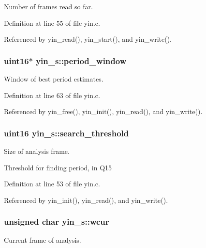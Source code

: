 Number of frames read so far. 



Definition at line 55 of file yin.\-c.



Referenced by yin\-\_\-read(), yin\-\_\-start(), and yin\-\_\-write().

\subsubsection[{period\-\_\-window}]{\setlength{\rightskip}{0pt plus 5cm}uint16$\ast$ yin\-\_\-s\-::period\-\_\-window}\label{structyin__s_a1928cec127e250f6cd15249085bc9fc8}


Window of best period estimates. 



Definition at line 63 of file yin.\-c.



Referenced by yin\-\_\-free(), yin\-\_\-init(), yin\-\_\-read(), and yin\-\_\-write().

\subsubsection[{search\-\_\-threshold}]{\setlength{\rightskip}{0pt plus 5cm}uint16 yin\-\_\-s\-::search\-\_\-threshold}\label{structyin__s_a8cca938167af6b504458ff9578420afd}


Size of analysis frame. 

Threshold for finding period, in Q15 

Definition at line 53 of file yin.\-c.



Referenced by yin\-\_\-init(), yin\-\_\-read(), and yin\-\_\-write().

\subsubsection[{wcur}]{\setlength{\rightskip}{0pt plus 5cm}unsigned char yin\-\_\-s\-::wcur}\label{structyin__s_ab79376deb3761d5d3ae72f727ac25660}


Current frame of analysis. 



